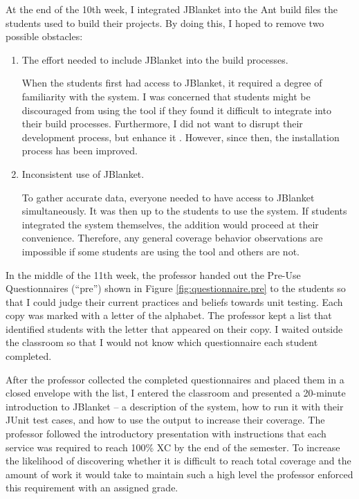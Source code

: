At the end of the 10th week, I integrated JBlanket into the Ant build files
the students used to build their projects.  By doing this, I hoped to
remove two possible obstacles:

\begin{enumerate}
\item The effort needed to include JBlanket into the build processes.

When the students first had access to JBlanket, it required a degree of
familiarity with the system.  I was concerned that students might be
discouraged from using the tool if they found it difficult to integrate
into their build processes.  Furthermore, I did not want to disrupt their
development process, but enhance it \cite{Dustin:1999}.  However, since
then, the installation process has been improved.

\item Inconsistent use of JBlanket.

To gather accurate data, everyone needed to have access to JBlanket
simultaneously.  It was then up to the students to use the system.  If
students integrated the system themselves, the addition would proceed at
their convenience.  Therefore, any general coverage behavior observations
are impossible if some students are using the tool and others are not.
\end{enumerate}

In the middle of the 11th week, the professor handed out the Pre-Use
Questionnaires (``pre'') shown in Figure \ref{fig:questionnaire.pre} to the
students so that I could judge their current practices and beliefs towards
unit testing.  Each copy was marked with a letter of the alphabet.  The
professor kept a list that identified students with the letter that
appeared on their copy.  I waited outside the classroom so that I would not
know which questionnaire each student completed.

After the professor collected the completed questionnaires and placed them
in a closed envelope with the list, I entered the classroom and presented a
20-minute introduction to JBlanket -- a description of the system, how to
run it with their JUnit test cases, and how to use the output to increase
their coverage.  The professor followed the introductory presentation with
instructions that each service was required to reach 100\% XC by the end of
the semester.  To increase the likelihood of discovering whether it is
difficult to reach total coverage and the amount of work it would take to
maintain such a high level the professor enforced this requirement with an
assigned grade.

